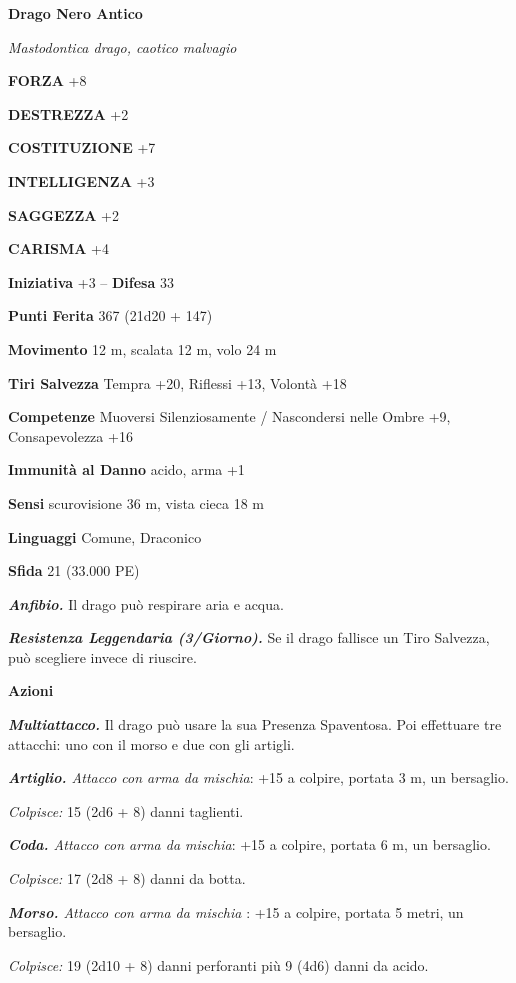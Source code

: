 \begin{multicols}{2}
\medskip{}\textbf{Drago Nero Antico}

\emph{Mastodontica drago, caotico malvagio}

\textbf{FORZA} +8

\textbf{DESTREZZA} +2

\textbf{COSTITUZIONE} +7

\textbf{INTELLIGENZA} +3

\textbf{SAGGEZZA} +2

\textbf{CARISMA} +4

\textbf{Iniziativa} +3 -- \textbf{Difesa} 33

\textbf{Punti Ferita} 367 (21d20 + 147)

\textbf{Movimento} 12 m, scalata 12 m, volo 24 m

\textbf{Tiri Salvezza} Tempra +20, Riflessi +13, Volontà +18

\textbf{Competenze} Muoversi Silenziosamente / Nascondersi nelle Ombre +9, Consapevolezza +16

\textbf{Immunità al Danno} acido, arma +1

\textbf{Sensi} scurovisione 36 m, vista cieca 18 m

\textbf{Linguaggi} Comune, Draconico

\textbf{Sfida} 21 (33.000 PE)

\emph{\textbf{Anfibio.}} Il drago può respirare aria e acqua.

\emph{\textbf{Resistenza Leggendaria (3/Giorno).}} Se il drago fallisce un Tiro Salvezza, può scegliere invece di riuscire.

\textbf{Azioni}

\emph{\textbf{Multiattacco.}} Il drago può usare la sua Presenza Spaventosa. Poi effettuare tre attacchi: uno con il morso e due con gli artigli.

\emph{\textbf{Artiglio.} Attacco con arma da mischia}: +15 a colpire, portata 3 m, un bersaglio.

\emph{Colpisce:} 15 (2d6 + 8) danni taglienti.

\emph{\textbf{Coda.} Attacco con arma da mischia}: +15 a colpire, portata 6 m, un bersaglio.

\emph{Colpisce:} 17 (2d8 + 8) danni da botta.

\emph{\textbf{Morso.} Attacco con arma da mischia} : +15 a colpire, portata 5 metri, un bersaglio.

\emph{Colpisce:} 19 (2d10 + 8) danni perforanti più 9 (4d6) danni da acido.


\end{multicols}
